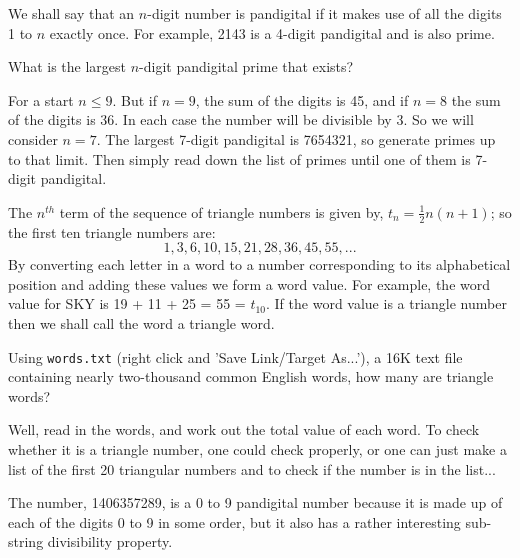 We shall say that an $n$-digit number is pandigital if it makes use of all the digits 1 to $n$ exactly once. For example, 2143 is a 4-digit pandigital and is also prime.

What is the largest $n$-digit pandigital prime that exists?

For a start $n \leq 9$.  But if $n=9$, the sum of the digits is 45, and if $n=8$ the sum of
the digits is 36.  In each case the number will be divisible by 3.  So we will consider $n=7$.
The largest 7-digit pandigital is 7654321, so generate primes up to that limit.  Then
simply read down the list of primes until one of them is 7-digit pandigital.




The $n^{th}$ term of the sequence of triangle numbers is given by, $t_n = \tfrac 12n(n+1)$; so the first ten triangle numbers are:
$$ 1, 3, 6, 10, 15, 21, 28, 36, 45, 55, ... $$
By converting each letter in a word to a number corresponding to its alphabetical position and adding these values we form a word value. For example, the word value for SKY is 19 + 11 + 25 = 55 = $t_{10}$. If the word value is a triangle number then we shall call the word a triangle word.

Using \verb"words.txt" (right click and 'Save Link/Target As...'), a 16K text file containing nearly two-thousand common English words, how many are triangle words?

Well, read in the words, and work out the total value of each word.  To check whether it is a triangle number, one could check properly, or one can just make a list of the first 20 triangular numbers and to check if the number is in the list...





The number, 1406357289, is a 0 to 9 pandigital number because it is made up of each of the digits 0 to 9 in some order, but it also has a rather interesting sub-string divisibility property.

